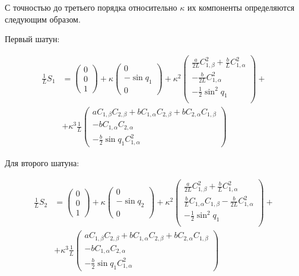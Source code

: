 С точностью до третьего порядка относительно $\kappa$ их компоненты определяются следующим образом.

Первый шатун:

\begin{equation}
\begin{aligned}
\frac{1}{L}S_1 &= \begin{pmatrix}0 \\ 0 \\ 1\end{pmatrix} + \kappa\begin{pmatrix}0 \\ -\sin{q_1}\\ 0\end{pmatrix} + \kappa^2\begin{pmatrix}\frac{a}{2L}C^2_{1,\beta} + \frac{b}{L}C_{1,\alpha}^2\\-\frac{b}{2L}C_{1,\alpha}^2\\ -\frac{1}{2}\sin^2{q_1} \\ \end{pmatrix} + \\
& + \kappa^3\frac{1}{L}\begin{pmatrix}aC_{1,\beta}C_{2,\beta} + bC_{1,\alpha}C_{2,\beta} + bC_{2,\alpha}C_{1,\beta} \\ -bC_{1,\alpha}C_{2,\alpha} \\ -\frac{b}{2}\sin{q_1}C_{1,\alpha}^2\end{pmatrix}
\end{aligned}
\end{equation}

Для второго шатуна:

\begin{equation}
\begin{aligned}
\frac{1}{L}S_2 &= \begin{pmatrix}0 \\ 0 \\ 1\end{pmatrix} + \kappa\begin{pmatrix}0 \\ -\sin{q_2}\\ 0\end{pmatrix} + \kappa^2\begin{pmatrix}\frac{a}{2L}C^2_{1,\beta} + \frac{b}{L}C_{1,\alpha}^2\\\frac{b}{L}C_{1,\alpha}C_{1,\beta} -\frac{b}{2L}C_{1,\alpha}^2\\ -\frac{1}{2}\sin^2{q_1} \\ \end{pmatrix} + \\
& + \kappa^3\frac{1}{L}\begin{pmatrix}aC_{1,\beta}C_{2,\beta} + bC_{1,\alpha}C_{2,\beta} + bC_{2,\alpha}C_{1,\beta} \\ -bC_{1,\alpha}C_{2,\alpha} \\ -\frac{b}{2}\sin{q_1}C_{1,\alpha}^2\end{pmatrix}
\end{aligned}
\end{equation}

